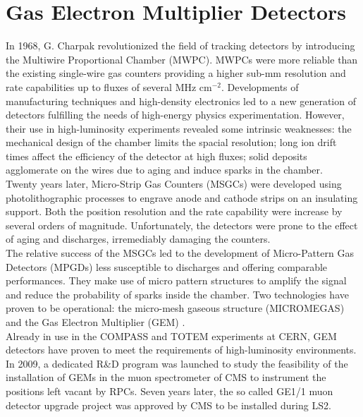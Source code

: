 \chapter{Gas Electron Multiplier Detectors}
\label{chap:II-1-gem}

  In 1968, G. Charpak revolutionized the field of tracking detectors by introducing the Multiwire Proportional Chamber (MWPC). MWPCs were more reliable than the existing single-wire gas counters providing a higher sub-mm resolution and rate capabilities up to fluxes of several MHz cm$^{-2}$. Developments of manufacturing techniques and high-density electronics led to a new generation of detectors fulfilling the needs of high-energy physics experimentation. However, their use in high-luminosity experiments revealed some intrinsic weaknesses: the mechanical design of the chamber limits the spacial resolution; long ion drift times affect the efficiency of the detector at high fluxes; solid deposits agglomerate on the wires due to aging and induce sparks in the chamber. \\

  Twenty years later, Micro-Strip Gas Counters (MSGCs) were developed using photolithographic processes to engrave anode and cathode strips on an insulating support. Both the position resolution and the rate capability were increase by several orders of magnitude. Unfortunately, the detectors were prone to the effect of aging and discharges, irremediably damaging the counters. \\

  The relative success of the MSGCs led to the development of Micro-Pattern Gas Detectors (MPGDs) less susceptible to discharges and offering comparable performances. They make use of micro pattern structures to amplify the signal and reduce the probability of sparks inside the chamber. Two technologies have proven to be operational: the micro-mesh gaseous structure (MICROMEGAS) and the Gas Electron Multiplier (GEM) \cite{SAULI1997531}. \\

  Already in use in the COMPASS and TOTEM experiments at CERN, GEM detectors have proven to meet the requirements of high-luminosity environments. In 2009, a dedicated R\&D program was launched to study the feasibility of the installation of GEMs in the muon spectrometer of CMS to instrument the positions left vacant by RPCs. Seven years later, the so called GE1/1 muon detector upgrade project was approved by CMS to be installed during LS2.

